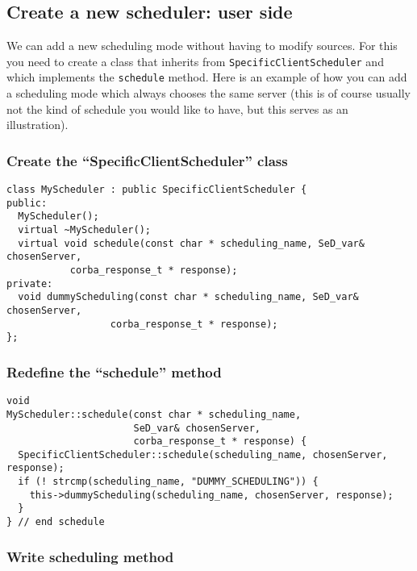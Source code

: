 \subsection{Create a new scheduler: user side}

We can add a new scheduling mode without having to modify \diet
sources. For this you need to create a class that inherits from
\texttt{SpecificClientScheduler} and which implements the
\texttt{schedule} method. Here is an example of how you can add a
scheduling mode which always chooses the same server (this is of
course usually not the kind of schedule you would like to have, but
this serves as an illustration).

\subsubsection{Create the ``SpecificClientScheduler'' class}

\begin{verbatim}
class MyScheduler : public SpecificClientScheduler {
public:
  MyScheduler();
  virtual ~MyScheduler();
  virtual void schedule(const char * scheduling_name, SeD_var& chosenServer,
           corba_response_t * response);
private:
  void dummyScheduling(const char * scheduling_name, SeD_var& chosenServer,
                  corba_response_t * response);
};
\end{verbatim}

\subsubsection{Redefine the ``schedule'' method}

\begin{verbatim}
void
MyScheduler::schedule(const char * scheduling_name,
                      SeD_var& chosenServer,
                      corba_response_t * response) {
  SpecificClientScheduler::schedule(scheduling_name, chosenServer, response);
  if (! strcmp(scheduling_name, "DUMMY_SCHEDULING")) {
    this->dummyScheduling(scheduling_name, chosenServer, response);
  }
} // end schedule
\end{verbatim}


\subsubsection{Write scheduling method}

